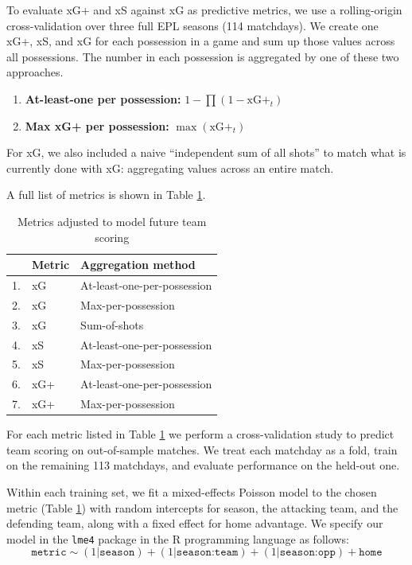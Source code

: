 \documentclass[12pt,letterpaper]{article}
\begin{document}
To evaluate xG+ and xS against xG as predictive metrics, we use a rolling-origin cross-validation over three full EPL seasons (114 matchdays). We create one xG+, xS, and xG for each possession in a game and sum up those values across all possessions. The number in each possession is aggregated by one of these two approaches. 

\begin{enumerate}
  \item \textbf{At-least-one per possession:} $1 - \prod(1 - \text{xG+}_t)$
  \item \textbf{Max xG+ per possession:} $\max(\text{xG+}_t)$
\end{enumerate}

For xG, we also included a naive ``independent sum of all shots'' to match what is currently done with xG: aggregating values across an entire match.

 A full list of metrics is shown in Table \ref{tab:all_metrics_modeled}.


\begin{table}[H]
\centering
\caption{Metrics adjusted to model future team scoring}
\label{tab:all_metrics_modeled}
\begin{tabular}{lll}
\toprule
 & \textbf{Metric} & \textbf{Aggregation method} \\
\midrule
1. & xG   & At-least-one-per-possession \\
2. & xG   & Max-per-possession \\
3. & xG   & Sum-of-shots \\
4. & xS   & At-least-one-per-possession \\
5. & xS   & Max-per-possession \\
6. & xG+  & At-least-one-per-possession \\
7. & xG+  & Max-per-possession \\
\bottomrule
\end{tabular}
\end{table}

For each metric listed in Table \ref{tab:all_metrics_modeled} we perform a cross-validation study to predict team scoring on out-of-sample matches. We treat each matchday as a fold, train on the remaining 113 matchdays, and evaluate performance on the held-out one.

Within each training set, we fit a mixed-effects Poisson model to the chosen metric (Table \ref{tab:all_metrics_modeled}) with random intercepts for season, the attacking team, and the defending team, along with a fixed effect for home advantage. We specify our model in the \texttt{lme4} package in the R programming language as follows:
\begin{equation*}
\texttt{metric} \sim (1|\texttt{season}) + (1|\texttt{season:team}) + (1|\texttt{season:opp}) + \texttt{home}
\end{equation*}
\end{document}
